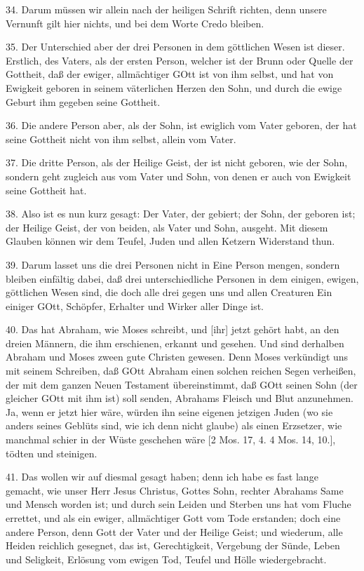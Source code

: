 34. Darum müssen wir allein nach der heiligen Schrift richten, denn unsere Vernunft gilt hier nichts, und bei dem Worte Credo bleiben.

35. Der Unterschied aber der drei Personen in dem göttlichen Wesen ist dieser. Erstlich, des Vaters, als der ersten Person, welcher ist der Brunn oder Quelle der Gottheit, daß der ewiger, allmächtiger GOtt ist von ihm selbst, und hat von Ewigkeit geboren in seinem väterlichen Herzen den Sohn, und durch die ewige Geburt ihm gegeben seine Gottheit.

36. Die andere Person aber, als der Sohn, ist ewiglich vom Vater geboren, der hat seine Gottheit nicht von ihm selbst, allein vom Vater.

37. Die dritte Person, als der Heilige Geist, der ist nicht geboren, wie der Sohn, sondern geht zugleich aus vom Vater und Sohn, von denen er auch von Ewigkeit seine Gottheit hat.

38. Also ist es nun kurz gesagt: Der Vater, der gebiert; der Sohn, der geboren ist; der Heilige Geist, der von beiden, als Vater und Sohn, ausgeht. Mit diesem Glauben können wir dem Teufel, Juden und allen Ketzern Widerstand thun.

39. Darum lasset uns die drei Personen nicht in Eine Person mengen, sondern bleiben einfältig dabei, daß drei unterschiedliche Personen in dem einigen, ewigen, göttlichen Wesen sind, die doch alle drei gegen uns und allen Creaturen Ein einiger GOtt, Schöpfer, Erhalter und Wirker aller Dinge ist.

40. Das hat Abraham, wie Moses schreibt, und [ihr] jetzt gehört habt, an den dreien Männern, die ihm erschienen, erkannt und gesehen. Und sind derhalben Abraham und Moses zween gute Christen gewesen. Denn Moses verkündigt uns mit seinem Schreiben, daß GOtt Abraham einen solchen reichen Segen verheißen, der mit dem ganzen Neuen Testament übereinstimmt, daß GOtt seinen Sohn (der gleicher GOtt mit ihm ist) soll senden, Abrahams Fleisch und Blut anzunehmen. Ja, wenn er jetzt hier wäre, würden ihn seine eigenen jetzigen Juden (wo sie anders seines Geblüts sind, wie ich denn nicht glaube) als einen Erzsetzer, wie manchmal schier in der
Wüste geschehen wäre [2 Mos. 17, 4. 4 Mos. 14, 10.], tödten und steinigen.

41. Das wollen wir auf diesmal gesagt haben; denn ich habe es fast lange gemacht, wie unser Herr Jesus Christus, Gottes Sohn, rechter Abrahams Same und Mensch worden ist; und durch sein Leiden und Sterben uns hat vom Fluche errettet, und als ein ewiger, allmächtiger Gott vom Tode erstanden; doch eine andere Person, denn Gott der Vater und der Heilige Geist; und wiederum, alle Heiden reichlich gesegnet, das ist, Gerechtigkeit, Vergebung der Sünde, Leben und Seligkeit, Erlösung vom ewigen Tod, Teufel und Hölle wiedergebracht.

